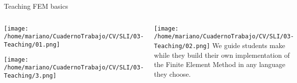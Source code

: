 \begin{frame}{Teaching FEM basics}

\begin{columns}
\begin{center}
\texttt{[image: /home/mariano/CuadernoTrabajo/CV/SLI/03-Teaching/01.png]}

\texttt{[image: /home/mariano/CuadernoTrabajo/CV/SLI/03-Teaching/3.png]}
\end{center}
\begin{center}
\texttt{[image: /home/mariano/CuadernoTrabajo/CV/SLI/03-Teaching/02.png]}
\vspace{0.5cm}
\begingroup
\tiny
We guide students make while they build their own 
implementation of the Finite Element Method 
in any language they choose.
\endgroup
\vspace{0.5cm}

\end{center}
\end{columns}

\end{frame}
